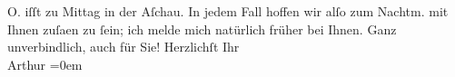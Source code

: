 \begin{ledgroupsized}[t]{13cm}
                  O. iſſt zu Mittag in der Aſchau. In jedem Fall hoffen wir alſo zum Nachtm. mit Ihnen
                  zuſa{\geminationm}en zu ſein; ich melde mich natürlich früher {\pb}bei Ihnen. Ganz unverbindlich, auch für Sie!\pend
           \pstart
           Herzlichſt Ihr{\\[\baselineskip]}\spacefill\mbox{Arthur}\pend
           \leftskip=0em{}\endnumbering{}\end{ledgroupsized}  \newcommand{\dateiname}{L02236}\newcommand{\titel}{Arthur Schnitzler an Richard Beer-Hofmann, 1. 8. 1916}\newcommand{\editorInnen}{Martin Anton Müller und Gerd-Hermann Susen}
      